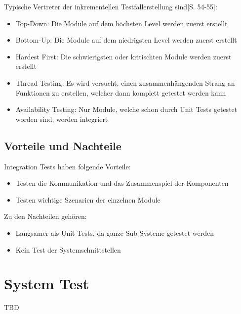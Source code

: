 \documentclass[a4paper,bibtotoc,oneside]{scrbook}
\begin{document}
Typische Vertreter der inkrementellen Testfallerstellung sind\cite{test_large_systems}[S. 54-55]:

\begin{itemize}
  \item Top-Down: Die Module auf dem höchsten Level werden zuerst erstellt
  \item Bottom-Up: Die Module auf dem niedrigsten Level werden zuerst erstellt
  \item Hardest First: Die schwierigsten oder kritischten Module werden zuerst erstellt
  \item Thread Testing: Es wird versucht, einen zusammenhängenden Strang an Funktionen zu erstellen, welcher dann komplett getestet werden kann
  \item Availability Testing: Nur Module, welche schon durch Unit Tests getestet worden sind, werden integriert
\end{itemize}

\section{Vorteile und Nachteile}
Integration Tests haben folgende Vorteile:

\begin{itemize}
  \item Testen die Kommunikation und das Zusammenspiel der Komponenten
  \item Testen wichtige Szenarien der einzelnen Module
\end{itemize}

Zu den Nachteilen gehören:

\begin{itemize}
  \item Langsamer als Unit Tests, da ganze Sub-Systeme getestet werden
  \item Kein Test der Systemschnittstellen
\end{itemize}


\chapter{System Test}
TBD
% 
\end{document}

